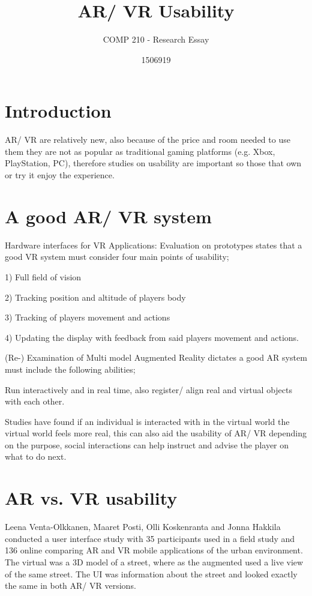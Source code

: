 \documentclass{scrartcl}
\title{AR/ VR Usability}
\subtitle{COMP 210 - Research Essay}
\author{1506919}
\begin{document}
\maketitle


\section*{Introduction}

AR/ VR are relatively new, also because of the price and room needed to use them they are not as popular as traditional gaming platforms (e.g. Xbox, PlayStation, PC), therefore studies on usability are important so those that own or try it enjoy the experience.

\section*{A good AR/ VR system}

Hardware interfaces for VR Applications: Evaluation on prototypes\cite{mentzelopoulos2015hardware} states that a good VR system must consider four main points of usability;

1) Full field of vision

2) Tracking position and altitude of players body

3) Tracking of players movement and actions

4) Updating the display with feedback from said players movement and actions.

(Re-) Examination of Multi model Augmented Reality\cite{rosa2016re} dictates a good AR system must include the following abilities;

Run interactively and in real time, also register/ align real and virtual objects with each other.

Studies have found if an individual is interacted with in the virtual world the virtual world feels more real\cite{madary2016real}, this can also aid the usability of AR/ VR depending on the purpose, social interactions can help instruct and advise the player on what to do next.

\section*{AR vs. VR usability}

Leena Venta-Olkkanen, Maaret Posti, Olli Koskenranta and Jonna Hakkila\cite{venta2014investigating} conducted a user interface study with 35 participants used in a field study and 136 online comparing AR and VR mobile applications of the urban environment. The virtual was a 3D model of a street, where as the augmented used a live view of the same street. The UI was information about the street and looked exactly the same in both AR/ VR versions.
\end{document}
